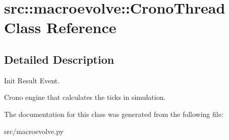 \hypertarget{classsrc_1_1macroevolve_1_1CronoThread}{
\section{src::macroevolve::CronoThread Class Reference}
\label{classsrc_1_1macroevolve_1_1CronoThread}
}


\subsection{Detailed Description}
\begin{DoxyVerb}Init Result Event.\end{DoxyVerb}
 \begin{DoxyVerb}Crono engine that calculates the ticks in simulation.\end{DoxyVerb}
 

The documentation for this class was generated from the following file:\begin{DoxyCompactItemize}
\item 
src/macroevolve.py\end{DoxyCompactItemize}
